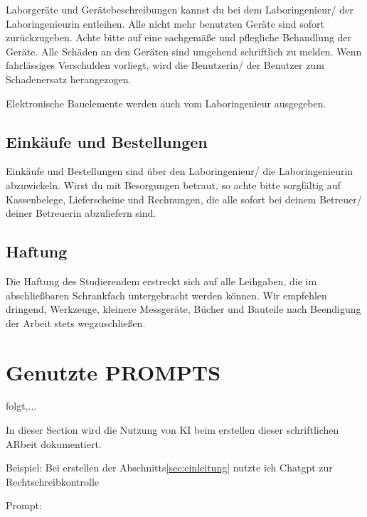 Laborgeräte und Gerätebeschreibungen kannst du  bei dem Laboringenieur/ der Laboringenieurin entleihen. 
Alle nicht mehr benutzten Geräte sind sofort zurückzugeben. Achte bitte auf eine sachgemäße und pflegliche Behandlung der Geräte. Alle Schäden an den Geräten sind umgehend schriftlich zu melden. Wenn fahrlässiges Verschulden vorliegt, wird die Benutzerin/ der Benutzer zum Schadenersatz herangezogen.

Elektronische Bauelemente werden auch vom Laboringenieur ausgegeben.

\subsection{Einkäufe und Bestellungen}

Einkäufe und Bestellungen sind über den Laboringenieur/ die Laboringenieurin abzuwickeln. Wirst du mit Besorgungen betraut, so achte bitte sorgfältig auf Kassenbelege, Lieferscheine und Rechnungen, die alle sofort bei deinem Betreuer/ deiner Betreuerin abzuliefern sind. 

\subsection{Haftung}
Die Haftung des Studierendem erstreckt sich auf alle Leihgaben, die im abschließbaren Schrankfach untergebracht werden können. 
Wir empfehlen  dringend, Werkzeuge, kleinere Messgeräte, Bücher und Bauteile nach Beendigung der Arbeit stets wegzuschließen.





\section{Genutzte PROMPTS}


folgt,...


In dieser Section wird die Nutzung von KI beim erstellen dieser schriftlichen ARbeit dokumentiert.

Beispiel: Bei erstellen der Abschnitts\ref{sec:einleitung} nutzte ich Chatgpt zur Rechtschreibkontrolle

Prompt: 